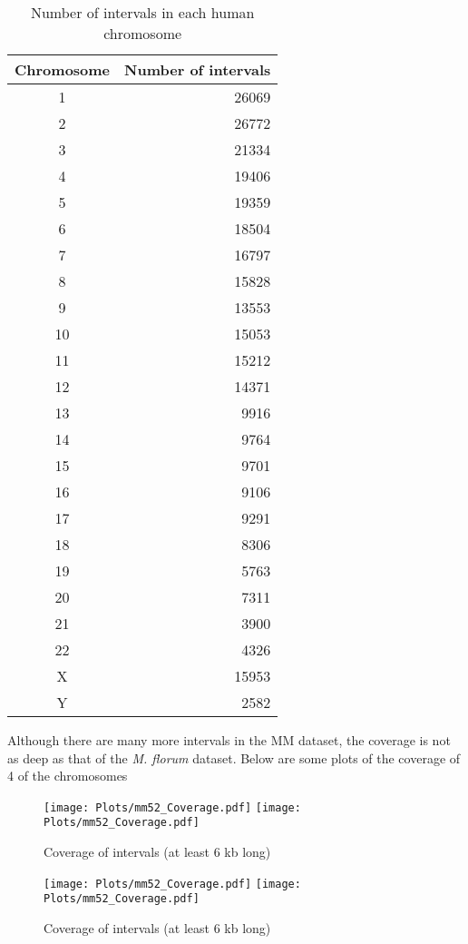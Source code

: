\begin{table}[H]
\centering
\begin{tabular}{c|r}
  \hline
  \hline
  Chromosome & Number of intervals \\ 
  \hline
  1 & 26069 \\
  2 & 26772 \\
  3 & 21334 \\
  4 & 19406 \\
  5 & 19359 \\
  6 & 18504 \\
  7 & 16797 \\
  8 & 15828 \\
  9 & 13553 \\
  10 & 15053 \\
  11 & 15212 \\
  12 & 14371 \\
  13 & 9916 \\
  14 & 9764 \\
  15 & 9701 \\
  16 & 9106 \\
  17 & 9291 \\
  18 & 8306 \\
  19 & 5763 \\
  20 & 7311 \\
  21 & 3900 \\
  22 & 4326 \\
  X & 15953 \\
  Y & 2582 \\
  \hline
  \hline
\end{tabular}
\caption{Number of intervals in each human chromosome}
\label{tab:mm52intervals}
\end{table}
Although there are many more intervals in the MM dataset, the coverage is not as deep as that of the {\emph{M. florum}} dataset. Below are some plots of the coverage of 4 of the chromosomes
\begin{figure}[H]
\begin{center}
\texttt{[image: Plots/mm52\_Coverage.pdf]}
\texttt{[image: Plots/mm52\_Coverage.pdf]}
\end{center}
\caption{Coverage of intervals (at least 6 kb long)}
\label{fig:Coverage_mm1}
\end{figure}

\begin{figure}[H]
\begin{center}
\texttt{[image: Plots/mm52\_Coverage.pdf]}
\texttt{[image: Plots/mm52\_Coverage.pdf]}
\end{center}
\caption{Coverage of intervals (at least 6 kb long)}
\label{fig:Coverage_mm2}
\end{figure}

